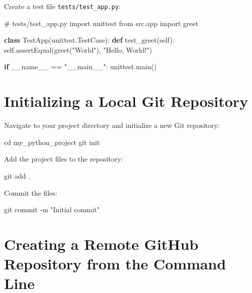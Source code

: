 \documentclass[
  letterpaper,
  DIV=11,
  numbers=noendperiod]{scrreprt}
\newenvironment{Shaded}{\begin{snugshade}}{\end{snugshade}}
\newcommand{\AttributeTok}[1]{\textcolor[rgb]{0.40,0.45,0.13}{#1}}
\newcommand{\BuiltInTok}[1]{\textcolor[rgb]{0.00,0.23,0.31}{#1}}
\newcommand{\CommentTok}[1]{\textcolor[rgb]{0.37,0.37,0.37}{#1}}
\newcommand{\ControlFlowTok}[1]{\textcolor[rgb]{0.00,0.23,0.31}{\textbf{#1}}}
\newcommand{\FunctionTok}[1]{\textcolor[rgb]{0.28,0.35,0.67}{#1}}
\newcommand{\ImportTok}[1]{\textcolor[rgb]{0.00,0.46,0.62}{#1}}
\newcommand{\KeywordTok}[1]{\textcolor[rgb]{0.00,0.23,0.31}{\textbf{#1}}}
\newcommand{\NormalTok}[1]{\textcolor[rgb]{0.00,0.23,0.31}{#1}}
\newcommand{\OperatorTok}[1]{\textcolor[rgb]{0.37,0.37,0.37}{#1}}
\newcommand{\StringTok}[1]{\textcolor[rgb]{0.13,0.47,0.30}{#1}}
\newcommand{\VariableTok}[1]{\textcolor[rgb]{0.07,0.07,0.07}{#1}}
\begin{document}
Create a test file \texttt{tests/test\_app.py}:

\begin{Shaded}
\begin{Highlighting}[]
\CommentTok{\# tests/test\_app.py}
\ImportTok{import}\NormalTok{ unittest}
\ImportTok{from}\NormalTok{ src.app }\ImportTok{import}\NormalTok{ greet}

\KeywordTok{class}\NormalTok{ TestApp(unittest.TestCase):}
    \KeywordTok{def}\NormalTok{ test\_greet(}\VariableTok{self}\NormalTok{):}
        \VariableTok{self}\NormalTok{.assertEqual(greet(}\StringTok{"World"}\NormalTok{), }\StringTok{"Hello, World!"}\NormalTok{)}

\ControlFlowTok{if} \VariableTok{\_\_name\_\_} \OperatorTok{==} \StringTok{"\_\_main\_\_"}\NormalTok{:}
\NormalTok{    unittest.main()}
\end{Highlighting}
\end{Shaded}

\section{Initializing a Local Git
Repository}\label{initializing-a-local-git-repository}

Navigate to your project directory and initialize a new Git repository:

\begin{Shaded}
\begin{Highlighting}[]
\BuiltInTok{cd}\NormalTok{ my\_python\_project}
\FunctionTok{git}\NormalTok{ init}
\end{Highlighting}
\end{Shaded}

Add the project files to the repository:

\begin{Shaded}
\begin{Highlighting}[]
\FunctionTok{git}\NormalTok{ add .}
\end{Highlighting}
\end{Shaded}

Commit the files:

\begin{Shaded}
\begin{Highlighting}[]
\FunctionTok{git}\NormalTok{ commit }\AttributeTok{{-}m} \StringTok{"Initial commit"}
\end{Highlighting}
\end{Shaded}

\section{Creating a Remote GitHub Repository from the Command
Line}\label{creating-a-remote-github-repository-from-the-command-line}
\end{document}
